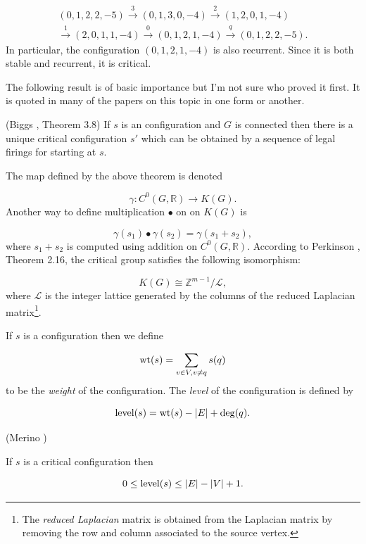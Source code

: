 \begin{example}
{\[
\begin{array}{c}
(0,1,2,2,-5)
\overset{3}{\to} (0,1,3,0,-4)
\overset{2}{\to} (1,2,0,1,-4)\\
\overset{1}{\to} (2,0,1,1,-4)
\overset{0}{\to} (0,1,2,1,-4)
\overset{q}{\to} (0,1,2,2,-5).
\end{array}
\]
In particular, the configuration $(0,1,2,1,-4)$ is 
also recurrent. Since it is both stable and recurrent, it
is critical.
}
\end{example}

The following result is of basic importance but
I'm not sure who proved it first. It is quoted in many of the papers
on this topic in one form or another.

\begin{theorem} (Biggs \cite{Biggs1999}, Theorem 3.8)
{\rm
If $s$ is an configuration and $G$ is connected
then there is a unique critical configuration $s'$
which can be obtained by a sequence of legal firings 
for starting at $s$.
}
\end{theorem}

The map defined by the above theorem is
denoted

\[
\gamma :C^0(G,{\mathbb{R}})\to K(G).
\]
Another way to define multiplication $\bullet$ on
on $K(G)$ is 

\[
\gamma(s_1)\bullet \gamma(s_2)
=\gamma(s_1+s_2),
\]
where $s_1+s_2$ is computed using addition on
$C^0(G,{\mathbb{R}})$. According to Perkinson \cite{PerkinsonEtAl2009},
Theorem 2.16, the critical group satisfies the
following isomorphism:

\[
K(G)\cong {\mathbb{Z}}^{m-1}/{\mathcal{L}},
\]
where ${\mathcal{L}}$ is the integer lattice 
generated by the columns of the reduced
Laplacian matrix\footnote{The {\it reduced Laplacian} matrix
is obtained from the Laplacian matrix by removing 
the row and column associated to the source 
vertex.}.

If $s$ is a configuration then we define

\[
{\rm wt}(s) = \sum_{v\in V, v\not= q} s(q)
\]
to be the {\it weight} of the configuration.
The {\it level} of the configuration is defined by

\[
{\rm level}(s) = {\rm wt}(s)-|E|+\deg(q).
\]

\begin{lemma}
(Merino \cite{Morino1999})
{\rm
If $s$ is a critical configuration then

\[
0\leq {\rm level}(s)\leq |E|-|V|+1.
\]
}
\end{lemma}

